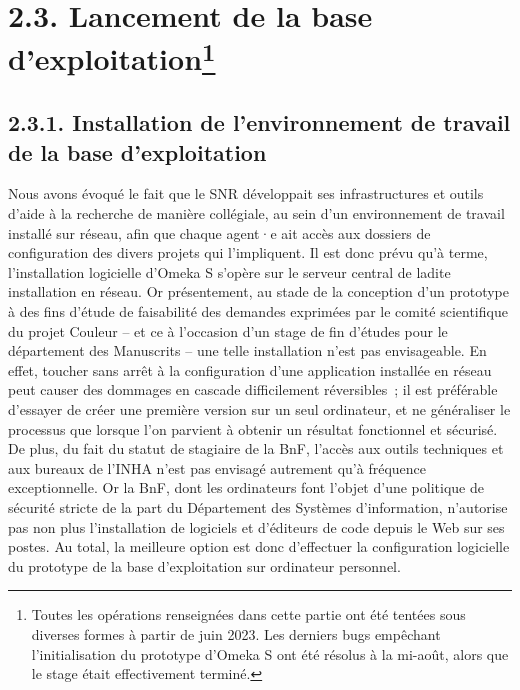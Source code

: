\documentclass[a4paper,12pt, twoside]{book}
\begin{document}
\section*{2.3. Lancement de la base d’exploitation\protect\footnote{Toutes les opérations renseignées dans cette partie ont été tentées sous diverses formes à partir de juin 2023. Les derniers bugs empêchant l’initialisation du prototype d’Omeka S ont été résolus à la mi-août, alors que le stage était effectivement terminé.}}

\subsection*{2.3.1. Installation de l’environnement de travail de la base d’exploitation}

Nous avons évoqué le fait que le SNR développait ses infrastructures et outils d’aide à la recherche de manière collégiale, au sein d’un environnement de travail installé sur réseau, afin que chaque agent·e ait accès aux dossiers de configuration des divers projets qui l’impliquent. Il est donc prévu qu’à terme,  l’installation logicielle d’Omeka S s’opère sur le serveur central de ladite installation en réseau. Or présentement, au stade de la conception d’un prototype à des fins d’étude de faisabilité des demandes exprimées par le comité scientifique du projet Couleur – et ce à l’occasion d’un stage de fin d’études pour le département des Manuscrits – une telle installation n’est pas envisageable. En effet, toucher sans arrêt à la configuration d’une application installée en réseau peut causer des dommages en cascade difficilement réversibles~; il est préférable d’essayer de créer une première version sur un seul ordinateur, et ne généraliser le processus que lorsque l’on parvient à obtenir un résultat fonctionnel et sécurisé. De plus, du fait du statut de stagiaire de la BnF, l’accès aux outils techniques et aux bureaux de l’INHA n’est pas envisagé autrement qu’à fréquence exceptionnelle. Or la BnF, dont les ordinateurs font l’objet d’une politique de sécurité stricte de la part du Département des Systèmes d’information, n’autorise pas non plus l’installation de logiciels et d’éditeurs de code depuis le Web sur ses postes. Au total, la meilleure option est donc d’effectuer la configuration logicielle du prototype de la base d’exploitation sur ordinateur personnel.
\end{document}
